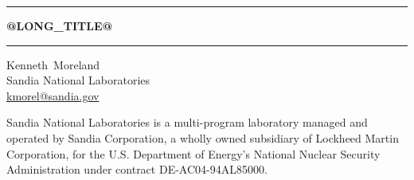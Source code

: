 \documentclass[@GLOBAL_OPTIONS@]{book}
\begin{document}
\frontmatter

\sloppy

\begin{titlepage}


  \noindent\rule{\linewidth}{1.5pt}
  \begin{centering}
    \Huge \bfseries
    @LONG_TITLE@

  \end{centering}
  \noindent\rule{\linewidth}{1.5pt}


  \begin{centering}
    \Large
    Kenneth~Moreland \\
    \small
    Sandia National Laboratories \\
    \href{mailto:kmorel@sandia.gov}{kmorel@sandia.gov} \\
  \end{centering}


  \begin{centering}
    \rmfamily\tiny

    Sandia National Laboratories is a multi-program laboratory managed and
    operated by Sandia Corporation, a wholly owned subsidiary of Lockheed
    Martin Corporation, for the U.S. Department of Energy's National
    Nuclear Security Administration under contract DE-AC04-94AL85000.

  \end{centering}
\end{titlepage}


\end{document}
